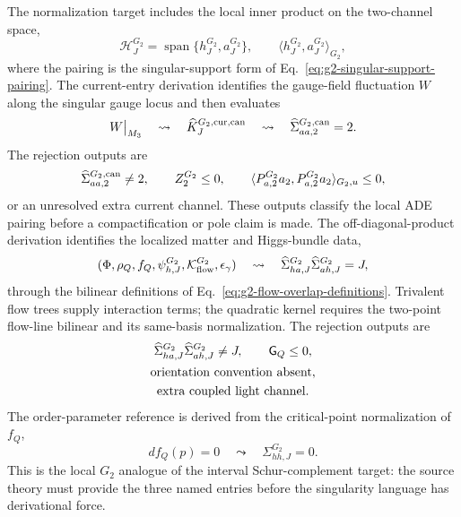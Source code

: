 The normalization target includes the local inner product on the two-channel
space,
\begin{equation}
  \mathcal H_J^{G_2}
  =
  \operatorname{span}\{h_J^{G_2},a_J^{G_2}\},
  \qquad
  \langle h_J^{G_2},a_J^{G_2}\rangle_{G_2},
  \label{eq:g2-local-inner-product}
\end{equation}
where the pairing is the singular-support form of
Eq.~\eqref{eq:g2-singular-support-pairing}.  The current-entry derivation
identifies the gauge-field fluctuation \(W\) along the singular gauge locus and
then evaluates
\begin{equation}
  W\big|_{M_3}
  \quad\leadsto\quad
  \widehat K_J^{G_2,{\rm cur,can}}
  \quad\leadsto\quad
  \widehat\Sigma_{aa,2}^{G_2,{\rm can}}=2 .
  \label{eq:g2-W-current-entry}
\end{equation}
The rejection outputs are
\begin{equation}
  \widehat\Sigma_{aa,2}^{G_2,{\rm can}}\ne 2,\qquad
  Z_2^{G_2}\le0,\qquad
  \langle P_{a,2}^{G_2}a_2,P_{a,2}^{G_2}a_2\rangle_{G_2,u}\le0,
  \label{eq:g2-current-rejection-outputs}
\end{equation}
or an unresolved extra current channel.  These outputs classify the local ADE
pairing before a compactification or pole claim is made.
The off-diagonal-product derivation identifies the localized matter and
Higgs-bundle data,
\begin{equation}
  (\Phi,\rho_Q,f_Q,\psi_{h,J}^{G_2},\mathcal K_{\rm flow}^{G_2},\epsilon_\gamma)
  \quad\leadsto\quad
  \widehat\Sigma_{ha,J}^{G_2}\widehat\Sigma_{ah,J}^{G_2}=J,
  \label{eq:g2-higgsbundle-mixing-entry}
\end{equation}
through the bilinear definitions of
Eq.~\eqref{eq:g2-flow-overlap-definitions}.  Trivalent flow trees supply
interaction terms; the quadratic kernel requires the two-point flow-line
bilinear and its same-basis normalization.  The rejection outputs are
\begin{equation}
  \begin{gathered}
  \widehat\Sigma_{ha,J}^{G_2}\widehat\Sigma_{ah,J}^{G_2}\ne J,
  \qquad
  \mathsf G_Q\le0,\\
  \hbox{orientation convention absent},\\
  \hbox{extra coupled light channel}.
  \end{gathered}
  \label{eq:g2-flow-overlap-rejection}
\end{equation}
The order-parameter reference is derived from the
critical-point normalization of \(f_Q\),
\begin{equation}
  df_Q(p)=0
  \quad\leadsto\quad
  \Sigma_{hh,J}^{G_2}=0 .
  \label{eq:g2-critical-reference-entry}
\end{equation}
This is the local \(G_2\) analogue of the interval Schur-complement target:
the source theory must provide the three named entries before the singularity
language has derivational force.

